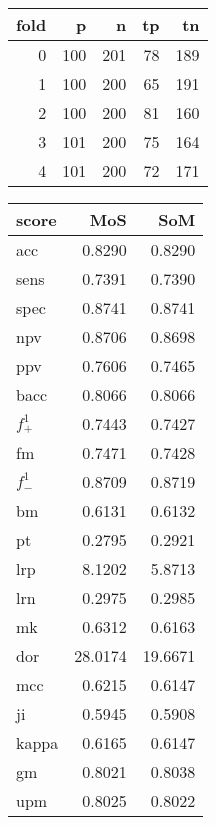 \begin{table}
\label{tab4}
\begin{scriptsize}
\begin{tabular}[t]{rrrrr}
\toprule
fold & p & n & tp & tn \\
\midrule
0 & 100 & 201 & 78 & 189 \\
1 & 100 & 200 & 65 & 191 \\
2 & 100 & 200 & 81 & 160 \\
3 & 101 & 200 & 75 & 164 \\
4 & 101 & 200 & 72 & 171 \\
\bottomrule
\end{tabular}
\end{scriptsize}
\begin{scriptsize}
\begin{tabular}[t]{lrr}
\toprule
score & MoS & SoM \\
\midrule
acc & 0.8290 & 0.8290 \\
sens & 0.7391 & 0.7390 \\
spec & 0.8741 & 0.8741 \\
npv & 0.8706 & 0.8698 \\
ppv & 0.7606 & 0.7465 \\
bacc & 0.8066 & 0.8066 \\
$f^1_+$ & 0.7443 & 0.7427 \\
fm & 0.7471 & 0.7428 \\
$f^1_-$ & 0.8709 & 0.8719 \\
bm & 0.6131 & 0.6132 \\
pt & 0.2795 & 0.2921 \\
lrp & 8.1202 & 5.8713 \\
lrn & 0.2975 & 0.2985 \\
mk & 0.6312 & 0.6163 \\
dor & 28.0174 & 19.6671 \\
mcc & 0.6215 & 0.6147 \\
ji & 0.5945 & 0.5908 \\
kappa & 0.6165 & 0.6147 \\
gm & 0.8021 & 0.8038 \\
upm & 0.8025 & 0.8022 \\
\bottomrule
\end{tabular}
\end{scriptsize}

\end{table}

